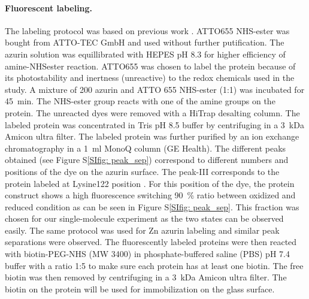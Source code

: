 \documentclass[journal=jacsat,manuscript=article]{achemso}
\begin{document}
\paragraph*{Fluorescent labeling.}
The labeling protocol was based on previous work \cite{nicolardi2012topdown}.
ATTO655 NHS-ester was bought from ATTO-TEC GmbH and used without further putification.
The azurin solution was equillibrated with HEPES pH 8.3 for higher efficiency of amine-NHSester reaction.
ATTO655 was chosen to label the protein because of its photostability and inertness (unreactive) to the redox chemicals used in the study.
A mixture of \SI{200}{\uM} azurin and ATTO 655 NHS-ester (1:1) was incubated for \SI{45}{\minute}.
The NHS-ester group reacts with one of the amine groups on the protein.
The unreacted dyes were removed with a HiTrap desalting column.
The labeled protein was concentrated in Tris pH 8.5 buffer by centrifuging in a \SI{3}{ kDa} Amicon ultra filter.
The labeled protein was further purified by an ion exchange chromatography in a \SI{1}{\ml} MonoQ column (GE Health).
The different peaks obtained (see Figure S\ref{SIfig: peak_sep}) correspond to different numbers and positions of the dye on the azurin surface. 
The peak-III corresponds to the protein labeled at Lysine122 position \cite{nicolardi2012topdown}.
For this position of the dye, the protein construct shows a high fluorescence switching \SI{90}{\percent} ratio between oxidized and reduced condition as can be seen in Figure S\ref{SIfig: peak_sep}. This fraction was chosen for our single-molecule experiment as the two states can be observed easily.
The same protocol was used for Zn azurin labeling and similar peak separations were observed.
The fluorescently labeled proteins were then reacted with biotin-PEG-NHS (MW 3400) in phosphate-buffered saline (PBS) pH 7.4 buffer with a ratio 1:5 to make sure each protein has at least one biotin.
The free biotin was then removed by centrifuging in a \SI{3}{ kDa} Amicon ultra filter.
The biotin on the protein will be used for immobilization on the glass surface.
\end{document}
